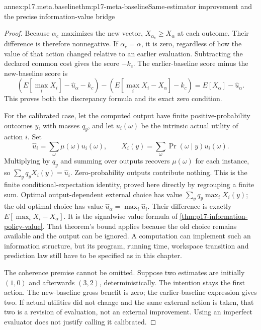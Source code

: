 \begin{annexitem}{annex:p17.meta.baseline}{thm:p17-meta-baseline}{Same-estimator improvement and the precise information-value bridge}
\begin{proof}
Because \(\alpha_c\) maximizes the new vector,
\(X_{\alpha_c}\geq X_\alpha\) at each outcome. Their difference
is therefore nonnegative. If \(\alpha_c=\alpha\), it is zero,
regardless of how the value of that action changed relative to
an earlier evaluation. Subtracting the declared common cost gives
the score \(-k_c\). The earlier-baseline score minus the
new-baseline score is
\[
 (E[\max_iX_i]-\widehat u_\alpha-k_c)
 -(E[\max_iX_i-X_\alpha]-k_c)
       =E[X_\alpha]-\widehat u_\alpha.
\]
This proves both the discrepancy formula and its exact zero condition.

For the calibrated case, let the computed output have finite
positive-probability outcomes \(y\), with masses \(q_y\),
and let \(u_i(\omega)\) be the intrinsic actual utility of
action \(i\). Set
\[
 \widehat u_i=\sum_\omega\mu(\omega)u_i(\omega),\qquad
 X_i(y)=\sum_\omega\Pr(\omega\mid y)u_i(\omega).
\]
Multiplying by \(q_y\) and summing over outputs recovers
\(\mu(\omega)\) for each instance, so
\(\sum_yq_yX_i(y)=\widehat u_i\). Zero-probability outputs
contribute nothing. This is the finite conditional-expectation
identity, proved here directly by regrouping a finite sum.
Optimal output-dependent external choice has value
\(\sum_yq_y\max_iX_i(y)\); the old optimal choice has value
\(\widehat u_\alpha=\max_i\widehat u_i\).
Their difference is exactly
\(E[\max_iX_i-X_\alpha]\).
It is the signalwise value formula of
\cref{thm:p17-information-policy-value}. That theorem's bound
applies because the old choice remains available and the output
can be ignored. A computation can implement such an information
structure, but its program, running time, workspace transition and
prediction law still have to be specified as in this chapter.

The coherence premise cannot be omitted. Suppose two estimates
are initially \((1,0)\) and afterwards \((3,2)\), deterministically.
The intention stays the first action. The new-baseline gross benefit
is zero; the earlier-baseline expression gives two. If actual
utilities did not change and the same external action is taken,
that two is a revision of evaluation, not an external improvement.
Using an imperfect evaluator does not justify calling it calibrated.
\end{proof}
\end{annexitem}

